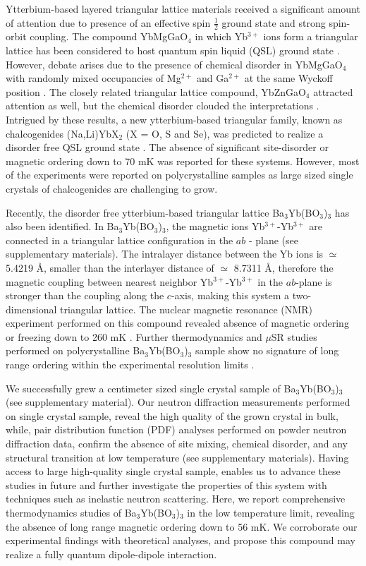 \documentclass[aps,prl,reprint,showpacs,showkeys,superscriptaddress,floatfix,twocolumn]{revtex4-2}
\newcommand{\bybo}{Ba$_3$Yb(BO$_3$)$_3$}
\begin{document}
Ytterbium-based layered triangular lattice materials received a significant amount of attention due to presence of an effective spin $\frac{1}{2}$ ground state and strong spin-orbit coupling. The compound YbMgGaO$_4$ in which Yb$^{3+}$ ions form a triangular lattice has been considered to host quantum spin liquid (QSL) ground state \cite{LiPRL2015,LiSciR2015,LiPRB2016,LiPRL2017}. However, debate arises due to the presence of chemical disorder in YbMgGaO$_4$  with randomly mixed occupancies of Mg$^{2+}$ and Ga$^{2+}$ at the same Wyckoff position \cite{ZhuPRL2017, ParkerPRB2018, ZhangPRX2018}. The closely related triangular lattice compound, YbZnGaO$_4$ attracted attention as well, but the chemical disorder clouded the interpretations \cite{MaPRL2018}. Intrigued by these results, a new ytterbium-based triangular family, known as chalcogenides (Na,Li)YbX$_2$ (X = O, S and Se), was  predicted to realize a disorder free QSL ground state \cite{BaenitzPRB2018, ranjith2019field,  BordelonNature2019, DingPRB2019, LiuChinLett2018, RanjithPRB2019, GuoPRM2020, BrodelonPRB2020}. The absence of significant site-disorder or magnetic ordering down to 70 mK was reported for these systems. However, most of the experiments were reported on polycrystalline samples as large sized single crystals of chalcogenides are challenging to grow. 

Recently, the disorder free ytterbium-based triangular lattice \bybo{} has also been identified. In \bybo{}, the magnetic ions Yb$^{3+}$-Yb$^{3+}$ are connected in a triangular lattice configuration in the $ab$ - plane (see supplementary materials). The intralayer distance between the Yb ions is $\simeq$ 5.4219 \AA, smaller than the interlayer distance of $\simeq$ 8.7311 \AA, therefore the magnetic coupling between nearest neighbor Yb$^{3+}$-Yb$^{3+}$ in the $ab$-plane is stronger than the coupling along the $c$-axis, making this system a two-dimensional triangular lattice. The nuclear magnetic resonance (NMR) experiment performed on this compound revealed absence of magnetic ordering or freezing down to 260 mK \cite{ZengPRB2019}. Further thermodynamics and $\mu$SR studies performed on polycrystalline \bybo{} sample show no signature of long range ordering within the experimental resolution limits \cite{Arxiv2021}. 

We successfully grew a centimeter sized single crystal sample of \bybo{} (see supplementary material). Our neutron diffraction measurements performed on single crystal sample, reveal the high quality of the grown crystal in bulk, while, pair distribution function (PDF) analyses performed on powder neutron diffraction data, confirm the absence of site mixing, chemical disorder, and any structural transition at low temperature (see supplementary materials). Having access to large high-quality single crystal sample, enables us to advance these studies in future and further investigate the properties of this system with techniques such as inelastic neutron scattering. Here, we report comprehensive thermodynamics studies of \bybo{} in the low temperature limit, revealing the absence of long range magnetic ordering down to 56 mK. We corroborate our experimental findings with theoretical analyses, and propose this compound may realize a fully quantum dipole-dipole interaction.
\end{document}
